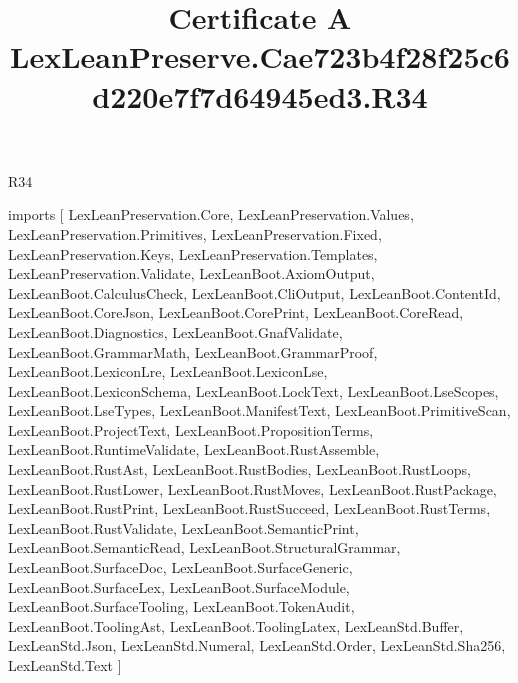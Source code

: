 \begin{lexlean}{R34}
\title{Certificate A LexLeanPreserve.Cae723b4f28f25c6d220e7f7d64945ed3.R34}
\begin{coremodule}
imports [
  LexLeanPreservation.Core,
  LexLeanPreservation.Values,
  LexLeanPreservation.Primitives,
  LexLeanPreservation.Fixed,
  LexLeanPreservation.Keys,
  LexLeanPreservation.Templates,
  LexLeanPreservation.Validate,
  LexLeanBoot.AxiomOutput,
  LexLeanBoot.CalculusCheck,
  LexLeanBoot.CliOutput,
  LexLeanBoot.ContentId,
  LexLeanBoot.CoreJson,
  LexLeanBoot.CorePrint,
  LexLeanBoot.CoreRead,
  LexLeanBoot.Diagnostics,
  LexLeanBoot.GnafValidate,
  LexLeanBoot.GrammarMath,
  LexLeanBoot.GrammarProof,
  LexLeanBoot.LexiconLre,
  LexLeanBoot.LexiconLse,
  LexLeanBoot.LexiconSchema,
  LexLeanBoot.LockText,
  LexLeanBoot.LseScopes,
  LexLeanBoot.LseTypes,
  LexLeanBoot.ManifestText,
  LexLeanBoot.PrimitiveScan,
  LexLeanBoot.ProjectText,
  LexLeanBoot.PropositionTerms,
  LexLeanBoot.RuntimeValidate,
  LexLeanBoot.RustAssemble,
  LexLeanBoot.RustAst,
  LexLeanBoot.RustBodies,
  LexLeanBoot.RustLoops,
  LexLeanBoot.RustLower,
  LexLeanBoot.RustMoves,
  LexLeanBoot.RustPackage,
  LexLeanBoot.RustPrint,
  LexLeanBoot.RustSucceed,
  LexLeanBoot.RustTerms,
  LexLeanBoot.RustValidate,
  LexLeanBoot.SemanticPrint,
  LexLeanBoot.SemanticRead,
  LexLeanBoot.StructuralGrammar,
  LexLeanBoot.SurfaceDoc,
  LexLeanBoot.SurfaceGeneric,
  LexLeanBoot.SurfaceLex,
  LexLeanBoot.SurfaceModule,
  LexLeanBoot.SurfaceTooling,
  LexLeanBoot.TokenAudit,
  LexLeanBoot.ToolingAst,
  LexLeanBoot.ToolingLatex,
  LexLeanStd.Buffer,
  LexLeanStd.Json,
  LexLeanStd.Numeral,
  LexLeanStd.Order,
  LexLeanStd.Sha256,
  LexLeanStd.Text
]


\end{coremodule}
\end{lexlean}
